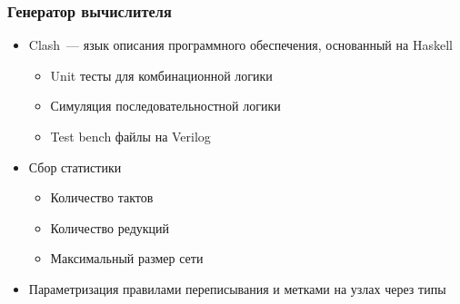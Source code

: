 \documentclass[aspectratio=169]{beamer}
\begin{document}
\begin{frame}
    \frametitle{Генератор вычислителя}

    \begin{itemize}
        \item Clash~--- язык описания программного обеспечения, основанный на Haskell
              \begin{itemize}
                  \item Unit тесты для комбинационной логики
                  \item Симуляция последовательностной логики
                  \item Test bench файлы на Verilog
              \end{itemize}
        \item Сбор статистики
              \begin{itemize}
                  \item Количество тактов
                  \item Количество редукций
                  \item Максимальный размер сети
              \end{itemize}
        \item Параметризация правилами переписывания и метками на узлах через типы
    \end{itemize}
\end{frame}
\end{document}
